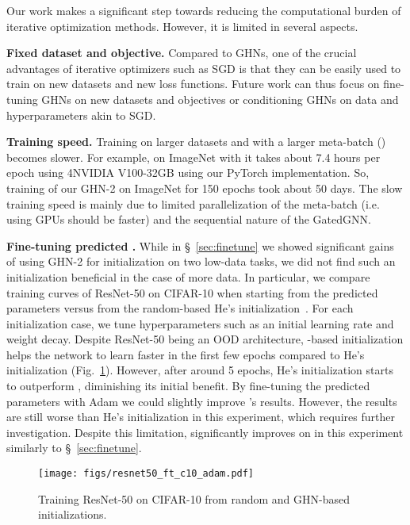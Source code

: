 Our work makes a significant step towards reducing the computational burden of iterative optimization methods. However, it is limited in several aspects.

\textbf{Fixed dataset and objective.} Compared to GHNs, one of the crucial advantages of iterative optimizers such as SGD is that they can be easily used to train on new datasets and new loss functions. Future work can thus focus on fine-tuning GHNs on new datasets and objectives or conditioning GHNs on data and hyperparameters akin to SGD.

\textbf{Training speed.} Training \ghnours on larger datasets and with a larger meta-batch () becomes slower. For example, on ImageNet with  it takes about 7.4 hours per epoch using 4NVIDIA V100-32GB using our PyTorch implementation. So, training of our GHN-2 on ImageNet for 150 epochs took about 50 days. The slow training speed is mainly due to limited parallelization of the meta-batch (i.e. using  GPUs should be faster) and the sequential nature of the GatedGNN. 

\textbf{Fine-tuning predicted \params.}
While in \S~\ref{sec:finetune} we showed significant gains of using GHN-2 for initialization on two low-data tasks, we did not find such an initialization beneficial in the case of more data. 
In particular, we compare training curves of ResNet-50 on CIFAR-10 when starting from the predicted parameters versus from the random-based He's initialization~\cite{he2015delving}.
For each initialization case, we tune hyperparameters such as an initial learning rate and weight decay.
Despite ResNet-50 being an OOD architecture, \ghnours-based initialization helps the network to learn faster in the first few epochs compared to He's initialization
(Fig.~\ref{fig:fine_tune}). 
However, after around 5 epochs, He's initialization starts to outperform \ghnours, diminishing its initial benefit. By fine-tuning the predicted parameters with Adam we could slightly improve \ghnours's results. However, the results are still worse than He's initialization in this experiment, which requires further investigation.
Despite this limitation, \ghnours significantly improves on \ghnbase in this experiment similarly to \S~\ref{sec:finetune}. 



\begin{figure}[htbp]
	\centering
	\texttt{[image: figs/resnet50\_ft\_c10\_adam.pdf]}
	\vspace{-5pt}
	\caption{Training ResNet-50 on CIFAR-10 from random and GHN-based initializations.
	}
	\label{fig:fine_tune}
	\vspace{-5pt}
\end{figure}

